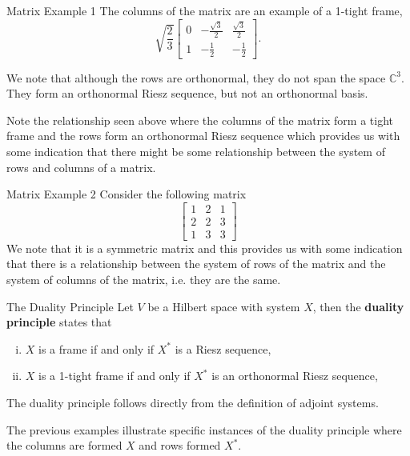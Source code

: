 \documentclass{beamer}
\begin{document}
\begin{frame}{Matrix Example 1}
The columns of the matrix are an example of a 1-tight frame, 
$$\sqrt{\frac{2}{3}}\left[ \begin{array}{ccc}
       0  & -\frac{\sqrt{3}}{2}  & \frac{\sqrt{3}}{2} \\
       1  & -\frac{1}{2} & -\frac{1}{2}
    \end{array}\right].$$
    
We note that although the rows are orthonormal, they do not span the space $\mathbb{C}^3$. They form an orthonormal Riesz sequence, but not an orthonormal basis.

Note the relationship seen above where the columns of the matrix form a tight frame and the rows form an orthonormal Riesz sequence which provides us with some indication that there might be some relationship between the system of rows and columns of a matrix.
\end{frame}

\begin{frame}{Matrix Example 2}
    Consider the following matrix
    $$\left[ \begin{array}{ccc}
       1  & 2  & 1 \\
       2  & 2 & 3 \\
       1 & 3 & 3
    \end{array}\right]$$
We note that it is a symmetric matrix and this provides us with some indication that there is a relationship between the system of rows of the matrix and the system of columns of the matrix, i.e. they are the same.
\end{frame}

\begin{frame}{The Duality Principle}
     Let $V$ be a Hilbert space with system $X$, then the \textbf{duality principle} states that
    \begin{enumerate}[(i)]
        \item $X$ is a frame if and only if $X^*$ is a Riesz sequence,
        \item $X$ is a 1-tight frame if and only if $X^*$ is an orthonormal Riesz sequence,
    \end{enumerate}
    The duality principle follows directly from the definition of adjoint systems.
    
    The previous examples illustrate specific instances of the duality principle where the columns are formed $X$ and rows formed $X^*$.
\end{frame}
\end{document}

